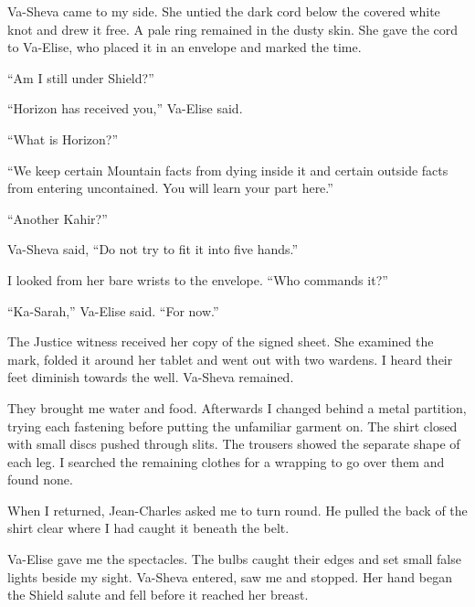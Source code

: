 Va-Sheva came to my side. She untied the dark cord below the covered white knot and drew it free. A pale ring remained in the dusty skin. She gave the cord to Va-Elise, who placed it in an envelope and marked the time.\par

``Am I still under Shield?''\par

``Horizon has received you,'' Va-Elise said.\par

``What is Horizon?''\par

``We keep certain Mountain facts from dying inside it and certain outside facts from entering uncontained. You will learn your part here.''\par

``Another Kahir?''\par

Va-Sheva said, ``Do not try to fit it into five hands.''\par

I looked from her bare wrists to the envelope. ``Who commands it?''\par

``Ka-Sarah,'' Va-Elise said. ``For now.''\par

The Justice witness received her copy of the signed sheet. She examined the mark, folded it around her tablet and went out with two wardens. I heard their feet diminish towards the well. Va-Sheva remained.\par

They brought me water and food. Afterwards I changed behind a metal partition, trying each fastening before putting the unfamiliar garment on. The shirt closed with small discs pushed through slits. The trousers showed the separate shape of each leg. I searched the remaining clothes for a wrapping to go over them and found none.\par

When I returned, Jean-Charles asked me to turn round. He pulled the back of the shirt clear where I had caught it beneath the belt.\par

Va-Elise gave me the spectacles. The bulbs caught their edges and set small false lights beside my sight. Va-Sheva entered, saw me and stopped. Her hand began the Shield salute and fell before it reached her breast.\par

